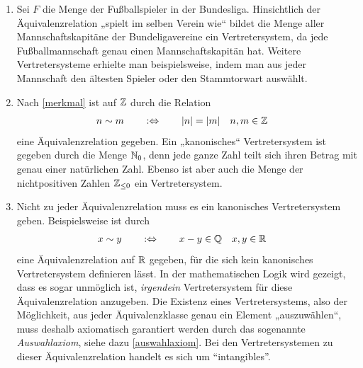 \begin{bsp}[*] \quad
    \begin{enumerate}
        \item Sei $F$ die Menge der Fußballspieler in der Bundesliga. Hinsichtlich der Äquivalenzrelation „spielt im selben Verein wie“ bildet die Menge aller Mannschaftskapitäne der Bundeligavereine ein Vertretersystem, da jede Fußballmannschaft genau einen Mannschaftskapitän hat. Weitere Vertretersysteme erhielte man beispielsweise, indem man aus jeder Mannschaft den ältesten Spieler oder den Stammtorwart auswählt.
        \item Nach \cref{merkmal} ist auf $\mathbb Z$ durch die Relation
        \begin{align*}
            n\sim m\qquad&:\Leftrightarrow\qquad \vert n\vert=\vert m\vert && n,m\in \mathbb Z
        \end{align*}
        eine Äquivalenzrelation gegeben. Ein „kanonisches“ Vertretersystem ist gegeben durch die Menge $\mathbb N_0$, denn jede ganze Zahl teilt sich ihren Betrag mit genau einer natürlichen Zahl. Ebenso ist aber auch die Menge der nichtpositiven Zahlen $\mathbb Z_{\le 0}$ ein Vertretersystem.
        \item Nicht zu jeder Äquivalenzrelation muss es ein kanonisches Vertretersystem geben. Beispielsweise ist durch
        \begin{align*}
            x\sim y \qquad&:\Leftrightarrow\qquad x-y\in \mathbb Q && x,y\in \mathbb R
        \end{align*}
        eine Äquivalenzrelation auf $\mathbb R$ gegeben, für die sich kein kanonisches Vertretersystem definieren lässt. In der mathematischen Logik wird gezeigt, dass es sogar unmöglich ist, \emph{irgendein} Vertretersystem für diese Äquivalenzrelation anzugeben. Die Existenz eines Vertretersystems, also der Möglichkeit, aus jeder Äquivalenzklasse genau ein Element „auszuwählen“, muss deshalb axiomatisch garantiert werden durch das sogenannte \emph{Auswahlaxiom}, siehe dazu \cref{auswahlaxiom}. Bei den Vertretersystemen zu dieser Äquivalenzrelation handelt es sich um ``intangibles''.
    \end{enumerate}
\end{bsp}





